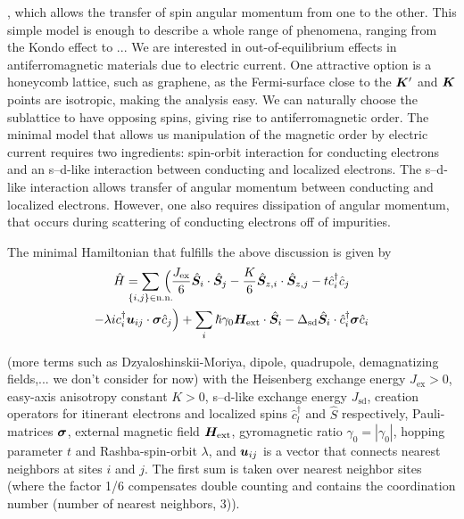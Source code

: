 , which allows the transfer of spin angular momentum from one to the other. This simple model is enough to describe a whole range of phenomena, ranging from the Kondo effect to ... 
We are interested in out-of-equilibrium effects in antiferromagnetic materials due to electric current. One attractive option is a honeycomb lattice, such as graphene, as the Fermi-surface close to the $\boldsymbol{K}'$ and $\boldsymbol{K}$ points are isotropic, making the analysis easy. We can naturally choose the sublattice to have opposing spins, giving rise to antiferromagnetic order. The minimal model that allows us manipulation of the magnetic order by electric current requires two ingredients: spin-orbit interaction for conducting electrons and an s--d-like interaction between conducting and localized electrons. The s--d-like interaction allows transfer of angular momentum between conducting and localized electrons. However, one also requires dissipation of angular momentum, that occurs during scattering of conducting electrons off of impurities. 

The minimal Hamiltonian that fulfills the above discussion is given by 
\begin{multline}
    \hat{H}
        = \sum_{\mathclap{\{i,j\}\in\text{n.n.}}}\,\Big(\frac{J_{\text{ex}}}{6}\hat{\bb{S}}_i\cdot\hat{\bb{S}}_j - \frac{K}{6}\hat{\bb{S}}_{z,i}\cdot\hat{\bb{S}}_{z,j}-t \hat{c}_i^\dagger\hat{c}_j\\
        -\lambda i c_i^\dagger \bb{u}_{ij}\cdot\bb{\sigma}\hat{c}_j\Big)+\sum_i \hslash\gamma_0\bb{H}_\text{ext}\cdot\hat{\bb{S}}_i-\Delta_\text{sd}\hat{\bb{S}}_i\cdot\hat{c}_i^\dagger\bb{\sigma}\hat{c}_i
    \label{intro:eq:Hm}
\end{multline}

(more terms such as Dzyaloshinskii-Moriya, dipole, quadrupole, demagnatizing fields,... we don't consider for now) with the Heisenberg exchange energy $J_{\text{ex}}>0$, easy-axis anisotropy constant $K>0$, s--d-like exchange energy $J_{\text{sd}}$, creation operators for itinerant electrons and localized spins $\hat{c}^\dagger_l$ and $\hat{S}$ respectively, Pauli-matrices $\boldsymbol{\sigma}$, external magnetic field $\boldsymbol{H}_\text{ext}$, gyromagnetic ratio $\gamma_0=|\gamma_0|$, hopping parameter $t$ and Rashba-spin-orbit $\lambda$, and $\boldsymbol{u}_{ij}$ is a vector that connects nearest neighbors at sites $i$ and $j$.  The first sum is taken over nearest neighbor sites (where the factor 1/6 compensates double counting and contains the coordination number (number of nearest neighbors, 3)). 

